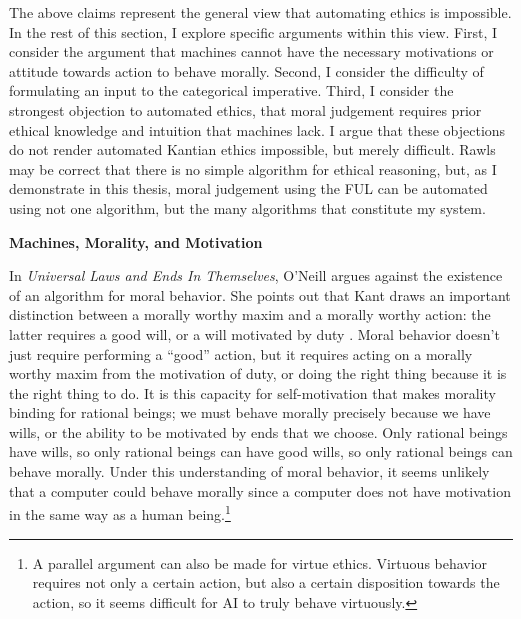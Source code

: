 \begin{isabellebody}
\begin{isamarkuptext}
The above claims represent the general view that automating ethics is impossible. In the
rest of this section, I explore specific arguments within this view. First, I consider the argument 
that machines cannot have the necessary motivations or attitude towards action to behave morally. Second, 
I consider the difficulty of formulating
an input to the categorical imperative. Third, I consider the strongest objection to automated ethics, 
that moral judgement requires prior ethical knowledge and intuition that machines lack. I argue that 
these objections do not render automated Kantian ethics impossible, but merely difficult. Rawls may be 
correct that there is no simple algorithm for ethical reasoning, but, as
I demonstrate in this thesis, moral judgement using the FUL can be automated using not one
algorithm, but the many algorithms that constitute my system.

\medskip

\noindent \textbf{Machines, Morality, and Motivation}

In \emph{Universal Laws and Ends In Themselves}, O'Neill argues against the existence of an algorithm for
moral behavior. She points out that Kant draws an important distinction between a morally worthy maxim
and a morally worthy action: the latter requires a good will, or a will motivated by duty \citep[345]{oneilluniversallaws}. 
Moral behavior doesn't just require performing
a ``good'' action, but it requires acting on a morally worthy maxim from the motivation of duty, or 
doing the right thing because it is the right thing to do. It is this capacity 
for self-motivation that makes morality binding for rational beings; we must behave morally precisely 
because we have wills, or the ability to be motivated by ends
that we choose. Only rational beings have wills, so only rational beings can have good wills, so only 
rational beings can behave morally. Under this understanding
of moral behavior, it seems unlikely that a computer could behave morally
since a computer does not have motivation in the same way as a human being.\footnote{A parallel argument can also be made for virtue ethics. Virtuous
behavior requires not only a certain action, but also a certain disposition towards the action, so it seems
difficult for AI to truly behave virtuously.}


\end{isamarkuptext}
\end{isabellebody}
